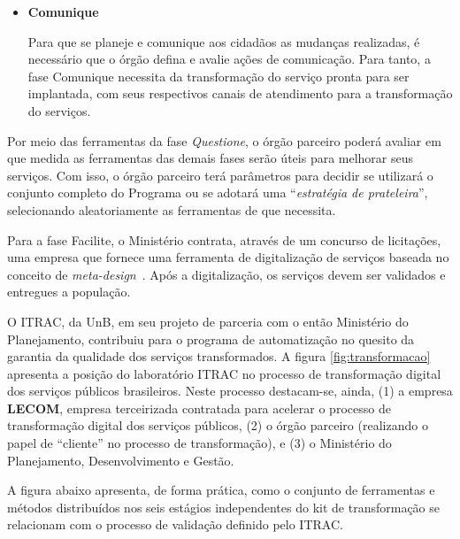 \begin{itemize}
\item \textbf{Comunique}


Para que se planeje e comunique aos cidadãos as mudanças realizadas, é necessário que o órgão defina e avalie ações de comunicação. Para tanto, a fase Comunique necessita da transformação do serviço pronta para ser implantada, com seus respectivos canais de atendimento para a transformação do serviços. 

\end{itemize}

Por meio das ferramentas da fase \textit{Questione}, o órgão parceiro poderá avaliar em que medida as ferramentas das demais fases serão úteis para melhorar seus serviços. Com isso, o órgão parceiro terá parâmetros para decidir se utilizará o conjunto completo do Programa ou se adotará uma ``\textit{estratégia de prateleira}'', selecionando aleatoriamente as ferramentas de que necessita.

Para a fase Facilite, o Ministério contrata, através de um concurso de licitações, uma empresa que fornece uma ferramenta de digitalização de serviços baseada no conceito de \textit{meta-design}~\cite{fogli2012meta}. Após a digitalização, os serviços devem ser validados e entregues a população. 

O ITRAC, da UnB, em seu projeto de parceria com o então Ministério do Planejamento, contribuiu para o programa de automatização no quesito da garantia da qualidade dos serviços transformados. A figura \ref{fig:transformacao} apresenta a posição do laboratório ITRAC no processo de transformação digital dos serviços públicos brasileiros. Neste processo destacam-se, ainda, (1) a empresa \textbf{LECOM}, empresa terceirizada contratada para acelerar o processo de transformação digital dos serviços públicos, (2) o órgão parceiro (realizando o papel de ``cliente'' no processo de transformação), e (3) o Ministério do Planejamento, Desenvolvimento e Gestão.

A figura abaixo apresenta, de forma prática, como o conjunto de ferramentas e métodos distribuídos nos seis estágios independentes do kit de transformação se relacionam com o processo de validação definido pelo ITRAC.


